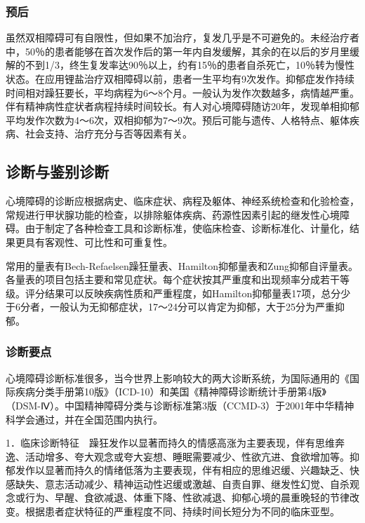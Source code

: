 \subsubsection{预后}

虽然双相障碍可有自限性，但如果不加治疗，复发几乎是不可避免的。未经治疗者中，50％的患者能够在首次发作后的第一年内自发缓解，其余的在以后的岁月里缓解的不到1/3，终生复发率达90％以上，约有15％的患者自杀死亡，10％转为慢性状态。在应用锂盐治疗双相障碍以前，患者一生平均有9次发作。抑郁症发作持续时间相对躁狂要长，平均病程为6～8个月。一般认为发作次数越多，病情越严重。伴有精神病性症状者病程持续时间较长。有人对心境障碍随访20年，发现单相抑郁平均发作次数为4～6次，双相抑郁为7～9次。预后可能与遗传、人格特点、躯体疾病、社会支持、治疗充分与否等因素有关。

\subsection{诊断与鉴别诊断}

心境障碍的诊断应根据病史、临床症状、病程及躯体、神经系统检查和化验检查，常规进行甲状腺功能的检查，以排除躯体疾病、药源性因素引起的继发性心境障碍。由于制定了各种检查工具和诊断标准，使临床检查、诊断标准化、计量化，结果更具有客观性、可比性和可重复性。

常用的量表有Bech-Refaelsen躁狂量表、Hamilton抑郁量表和Zung抑郁自评量表。各量表的项目包括主要和常见症状。每个症状按其严重度和出现频率分成若干等级。评分结果可以反映疾病性质和严重程度，如Hamilton抑郁量表17项，总分少于6分者，一般认为无抑郁症状，17～24分可以肯定为抑郁，大于25分为严重抑郁。

\subsubsection{诊断要点}

心境障碍诊断标准很多，当今世界上影响较大的两大诊断系统，为国际通用的《国际疾病分类手册第10版》（ICD-10）和美国《精神障碍诊断统计手册第4版》（DSM-Ⅳ）。中国精神障碍分类与诊断标准第3版（CCMD-3）于2001年中华精神科学会通过，并在全国范围内执行。

1．临床诊断特征　躁狂发作以显著而持久的情感高涨为主要表现，伴有思维奔逸、活动增多、夸大观念或夸大妄想、睡眠需要减少、性欲亢进、食欲增加等。抑郁发作以显著而持久的情绪低落为主要表现，伴有相应的思维迟缓、兴趣缺乏、快感缺失、意志活动减少、精神运动性迟缓或激越、自责自罪、继发性幻觉、自杀观念或行为、早醒、食欲减退、体重下降、性欲减退、抑郁心境的晨重晚轻的节律改变。根据患者症状特征的严重程度不同、持续时间长短分为不同的临床亚型。

